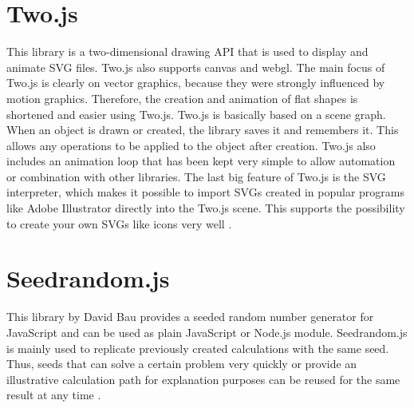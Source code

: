 \section{Two.js}
\label{sec:tecTwo}
This library is a two-dimensional drawing API that is used to display and animate SVG files. Two.js also supports canvas and webgl. The main focus of Two.js is clearly on vector graphics, because they were strongly influenced by motion graphics. Therefore, the creation and animation of flat shapes is shortened and easier using Two.js. Two.js is basically based on a scene graph. When an object is drawn or created, the library saves it and remembers it. This allows any operations to be applied to the object after creation. Two.js also includes an animation loop that has been kept very simple to allow automation or combination with other libraries. The last big feature of Two.js is the SVG interpreter, which makes it possible to import SVGs created in popular programs like Adobe Illustrator directly into the Two.js scene. This supports the possibility to create your own SVGs like icons very well \cite{TwoJsAuthors2019}. 

\section{Seedrandom.js}
\label{sec:tecSeed}
This library by David Bau provides a seeded random number generator for JavaScript and can be used as plain JavaScript or Node.js module. Seedrandom.js is mainly used to replicate previously created calculations with the same seed. Thus, seeds that can solve a certain problem very quickly or provide an illustrative calculation path for explanation purposes can be reused for the same result at any time \cite{Bau2019}. 

